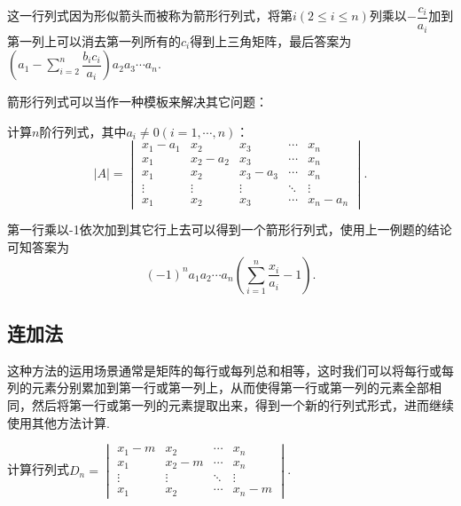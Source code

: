 \begin{solution}
    这一行列式因为形似箭头而被称为箭形行列式，将第$i(2\leqslant i\leqslant n)$列乘以$-\dfrac{c_i}{a_i}$加到第一列上可以消去第一列所有的$c_i$得到上三角矩阵，最后答案为$(a_1-\sum\limits_{i=2}^n\dfrac{b_ic_i}{a_i})a_2a_3\cdots a_n$.
\end{solution}

箭形行列式可以当作一种模板来解决其它问题：

\begin{example}{}{}
    计算$n$阶行列式，其中$a_i\neq 0(i=1,\cdots,n)$：
    \[|A|=\begin{vmatrix}
        x_1-a_1 & x_2 & x_3 & \cdots & x_n \\
        x_1 & x_2-a_2 & x_3 & \cdots & x_n \\
        x_1 & x_2 & x_3-a_3 & \cdots & x_n \\
        \vdots & \vdots & \vdots & \ddots & \vdots \\
        x_1 & x_2 & x_3 & \cdots & x_n-a_n
    \end{vmatrix}.\]
\end{example}

\begin{solution}
    第一行乘以-1依次加到其它行上去可以得到一个箭形行列式，使用上一例题的结论可知答案为\[(-1)^na_1a_2\cdots a_n(\sum\limits_{i=1}^n\dfrac{x_i}{a_i}-1).\]
\end{solution}

\subsection{连加法}

这种方法的运用场景通常是矩阵的每行或每列总和相等，这时我们可以将每行或每列的元素分别累加到第一行或第一列上，从而使得第一行或第一列的元素全部相同，然后将第一行或第一列的元素提取出来，得到一个新的行列式形式，进而继续使用其他方法计算.

\begin{example}{}{}
    计算行列式$D_n=\begin{vmatrix}
            x_1-m  & x_2    & \cdots & x_n    \\
            x_1    & x_2-m  & \cdots & x_n    \\
            \vdots & \vdots & \ddots & \vdots \\
            x_1    & x_2    & \cdots & x_n-m
        \end{vmatrix}$.
\end{example}


